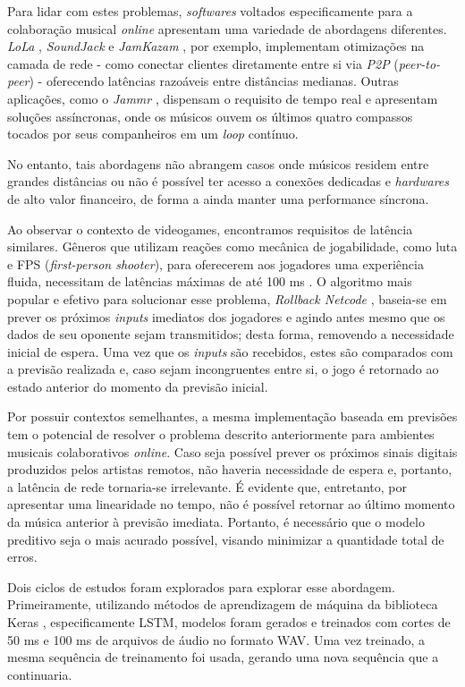 Para lidar com estes problemas, \textit{softwares} voltados especificamente para a colaboração musical \textit{online} apresentam uma variedade de abordagens diferentes. \textit{LoLa} \cite{lola}, \textit{SoundJack} \cite{soundjack} e \textit{JamKazam} \cite{jamkazam}, por exemplo, implementam otimizações na camada de rede - como conectar clientes diretamente entre si via \textit{P2P} (\textit{peer-to-peer}) - oferecendo latências razoáveis entre distâncias medianas. Outras aplicações, como o \textit{Jammr} \cite{jammr}, dispensam o requisito de tempo real e apresentam soluções assíncronas, onde os músicos ouvem os últimos quatro compassos tocados por seus companheiros em um \textit{loop} contínuo.

No entanto, tais abordagens não abrangem casos onde músicos residem entre grandes distâncias ou não é possível ter acesso a conexões dedicadas e \textit{hardwares} de alto valor financeiro, de forma a ainda manter uma performance síncrona.

Ao observar o contexto de videogames, encontramos requisitos de latência similares. Gêneros que utilizam reações como mecânica de jogabilidade, como luta e FPS (\textit{first-person shooter}), para oferecerem aos jogadores uma experiência fluida, necessitam de latências máximas de até 100 ms \cite{pubnub}. O algoritmo mais popular e efetivo para solucionar esse problema, \textit{Rollback Netcode} \cite{rollback}, baseia-se em prever os próximos \textit{inputs} imediatos dos jogadores e agindo antes mesmo que os dados de seu oponente sejam transmitidos; desta forma, removendo a necessidade inicial de espera. Uma vez que os \textit{inputs} são recebidos, estes são comparados com a previsão realizada e, caso sejam incongruentes entre si, o jogo é retornado ao estado anterior do momento da previsão inicial.

Por possuir contextos semelhantes, a mesma implementação baseada em previsões tem o potencial de resolver o problema descrito anteriormente para ambientes musicais colaborativos \textit{online}. Caso seja possível prever os próximos sinais digitais produzidos pelos artistas remotos, não haveria necessidade de espera e, portanto, a latência de rede tornaria-se irrelevante. É  evidente que, entretanto, por apresentar uma linearidade no tempo, não é possível retornar ao último momento da música anterior à previsão imediata. Portanto, é necessário que o modelo preditivo seja o mais acurado possível, visando minimizar a quantidade total de erros.

Dois ciclos de estudos foram explorados para explorar esse abordagem. Primeiramente, utilizando métodos de aprendizagem de máquina da biblioteca Keras \cite{keras}, especificamente LSTM, modelos foram gerados e treinados com cortes de 50 ms e 100 ms de arquivos de áudio no formato WAV. Uma vez treinado, a mesma sequência de treinamento foi usada, gerando uma nova sequência que a continuaria.

